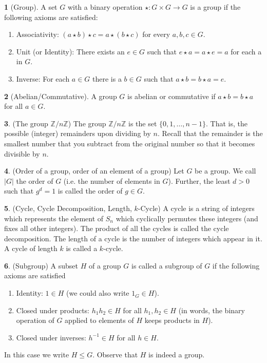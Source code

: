\documentclass[12pt]{article}
\theoremstyle{definition}
\newtheorem{definition}{\color{NavyBlue}{\textbf{Definition}}}
\begin{document}
\begin{definition}[Group]
A set $G$ with a binary operation $\star: G \times G \rightarrow G$ is a group if the following axioms are satisfied:
\begin{enumerate}
\item Associativity: $(a \star b) \star c = a \star (b \star c)$ for every $a,b,c \in G$.
\item Unit (or Identity): There exists an $e \in G$ such that $e \star a = a \star e = a$ for each a in $G$.
\item Inverse: For each $a \in G$ there is a $b \in G$ such that $a \star b = b \star a = e$.
\end{enumerate}
\end{definition}

\begin{definition}[Abelian/Commutative]
A group $G$ is abelian or commutative if $a \star b = b \star a$ for all $a \in G$.
\end{definition}

\begin{definition}(The group $\mathbb{Z} / n \mathbb{Z}$)
The group $\mathbb{Z} / n \mathbb{Z}$ is the set $\{0,1,\ldots,n-1\}$. That is, the possible (integer) remainders upon dividing by $n$. Recall that the remainder is the smallest number that you subtract from the original number so that it becomes divisible by $n$.
\end{definition}

\begin{definition}(Order of a group, order of an element of a group)
Let $G$ be a group. We call $|G|$ the order of $G$ (i.e. the number of elements in $G$). Further, the least $d >0$ such that $g^d = 1$ is called the order of $g \in G$.
\end{definition}

\begin{definition}(Cycle, Cycle Decomposition, Length, $k$-Cycle)
A cycle is a string of integers which represents the element of $S_n$ which cyclically permutes these integers (and fixes all other integers). The product of all the cycles is called the cycle decomposition. The length of a cycle is the number of integers which appear in it. A cycle of length $k$ is called a $k$-cycle.
\end{definition}

\begin{definition}(Subgroup)
A subset $H$ of a group $G$ is called a subgroup of $G$ if the following axioms are satisfied
\begin{enumerate}
\item Identity: $1 \in H$ (we could also write $1_G \in H$).
\item Closed under products: $h_1 h_2 \in H$ for all $h_1, h_2 \in H$ (in words, the binary operation of $G$ applied to elements of $H$ keeps products in $H$).
\item Closed under inverses: $h^{-1} \in H$ for all $h\in H$.
\end{enumerate}
In this case we write $H \leq G$. Observe that $H$ is indeed a group.
\end{definition}
\end{document}

